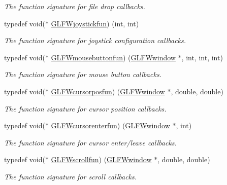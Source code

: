 \begin{DoxyCompactItemize}
\begin{DoxyCompactList}\small\item\em The function signature for file drop callbacks. \end{DoxyCompactList}\item 
typedef void($\ast$ \hyperlink{group__input_gaa67aa597e974298c748bfe4fb17d406d}{G\+L\+F\+Wjoystickfun}) (int, int)
\begin{DoxyCompactList}\small\item\em The function signature for joystick configuration callbacks. \end{DoxyCompactList}\item 
typedef void($\ast$ \hyperlink{group__input_ga39893a4a7e7c3239c98d29c9e084350c}{G\+L\+F\+Wmousebuttonfun}) (\hyperlink{group__window_ga3c96d80d363e67d13a41b5d1821f3242}{G\+L\+F\+Wwindow} $\ast$, int, int, int)
\begin{DoxyCompactList}\small\item\em The function signature for mouse button callbacks. \end{DoxyCompactList}\item 
typedef void($\ast$ \hyperlink{group__input_ga4cfad918fa836f09541e7b9acd36686c}{G\+L\+F\+Wcursorposfun}) (\hyperlink{group__window_ga3c96d80d363e67d13a41b5d1821f3242}{G\+L\+F\+Wwindow} $\ast$, double, double)
\begin{DoxyCompactList}\small\item\em The function signature for cursor position callbacks. \end{DoxyCompactList}\item 
typedef void($\ast$ \hyperlink{group__input_ga51ab436c41eeaed6db5a0c9403b1c840}{G\+L\+F\+Wcursorenterfun}) (\hyperlink{group__window_ga3c96d80d363e67d13a41b5d1821f3242}{G\+L\+F\+Wwindow} $\ast$, int)
\begin{DoxyCompactList}\small\item\em The function signature for cursor enter/leave callbacks. \end{DoxyCompactList}\item 
typedef void($\ast$ \hyperlink{group__input_ga4687e2199c60a18a8dd1da532e6d75c9}{G\+L\+F\+Wscrollfun}) (\hyperlink{group__window_ga3c96d80d363e67d13a41b5d1821f3242}{G\+L\+F\+Wwindow} $\ast$, double, double)
\begin{DoxyCompactList}\small\item\em The function signature for scroll callbacks. \end{DoxyCompactList}\item 

\end{DoxyCompactItemize}
